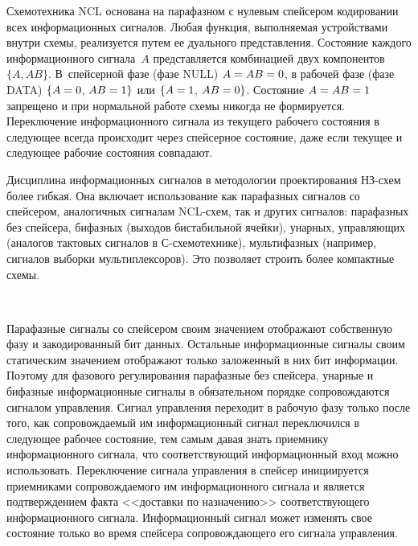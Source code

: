 \begin{multicols}{2}
       Схемотехника NCL основана на парафазном с нулевым спейсером кодировании всех 
информационных сигналов. Любая функция, выполняемая устройствами внутри схемы, 
реализуется путем ее дуального представления. Состояние каждого информационного 
сигнала~$A$ представляется комбинацией двух компонентов $\{A, AB\}$. В~спейсерной 
фазе (фазе NULL) $A\hm=AB\hm=0$, в рабочей фазе (фазе DATA) $\{A\hm=0$, $AB\hm=1\}$ 
или $\{A\hm=1$, $AB \hm =0\}$. Состояние $A\hm=AB\hm=1$ запрещено и при нормальной 
работе схемы никогда не формируется. Переключение информационного сигнала из 
текущего рабочего состояния в следующее всегда происходит через спейсерное состояние, 
даже если текущее и следующее рабочие состояния совпадают.
{

}
       
       Дисциплина информационных сигналов в методологии проектирования НЗ-схем 
более гибкая. Она включает использование как парафазных сигналов со спейсером, 
аналогичных сигналам NCL-схем, так и других сигналов: парафазных без спейсера, 
бифазных (выходов бистабильной ячейки), унарных, управляющих (аналогов тактовых 
сигналов в С-схе\-мо\-тех\-ни\-ке), мультифазных (например, сигналов выборки 
мультиплексоров). Это позволяет строить более компактные схемы.

      \begin{figure*}[b] %
                   \vspace*{-6pt}
 \begin{center}
 \mbox{%
 \epsfxsize=128.066mm
 }
 \end{center}
 \vspace*{-9pt}
      \end{figure*}
       
       Парафазные сигналы со спейсером своим значением отображают собственную фазу 
и закодированный бит данных. Остальные информационные сигналы своим статическим 
значением отображают только заложенный в них бит информации. Поэтому для фазового 
регулирования парафазные без спейсера, унарные и бифазные информационные сигналы в 
обязательном порядке сопровождаются сигналом управления. Сигнал управления переходит 
в рабочую фазу только после того, как сопровождаемый им информационный сигнал 
переключился в следующее рабочее состояние, тем самым давая знать приемнику 
информационного сигнала, что соответствующий информационный вход можно 
использовать. Переключение сигнала управления в спейсер инициируется приемниками 
сопровождаемого им информационного сигнала и является подтверждением факта 
<<доставки по назначению>> соответствующего информационного сигнала. 
Информационный сигнал может изменять свое состояние только во время спейсера 
со\-про\-вож\-да\-юще\-го его сигнала управления.


\end{multicols}
